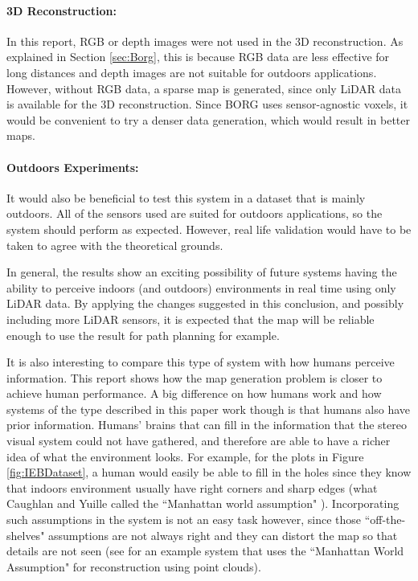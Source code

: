 \documentclass[11pt]{article}
\begin{document}
\paragraph{3D Reconstruction: } In this report, RGB or depth images were not used in the 3D reconstruction. As explained in Section \ref{sec:Borg}, this is because RGB data are less effective for long distances and depth images are not suitable for outdoors applications. However, without RGB data, a sparse map is generated, since only LiDAR data is available for the 3D reconstruction. Since BORG uses sensor-agnostic voxels, it would be convenient to try a denser data generation, which would result in better maps.
	
\paragraph{Outdoors Experiments: } It would also be beneficial to test this system in a dataset that is mainly outdoors. All of the sensors used are suited for outdoors applications, so the system should perform as expected. However, real life validation would have to be taken to agree with the theoretical grounds.

In general, the results show an exciting possibility of future systems having the ability to perceive indoors (and outdoors) environments in real time using only LiDAR data. By applying the changes suggested in this conclusion, and possibly including more LiDAR sensors, it is expected that the map will be reliable enough to use the result for path planning for example.

It is also interesting to compare this type of system with how humans perceive information. This report shows how the map generation problem is closer to achieve human performance. A big difference on how humans work and how systems of the type described in this paper work though is that humans also have prior information. Humans' brains that can fill in the information that the stereo visual system could not have gathered, and therefore are able to have a richer idea of what the environment looks. For example, for the plots in Figure \ref{fig:IEBDataset}, a human would easily be able to fill in the holes since they know that indoors environment usually have right corners and sharp edges (what Caughlan and Yuille called the ``Manhattan world assumption" \cite{coughlan1999manhattan}). Incorporating such assumptions in the system is not an easy task however, since those ``off-the-shelves" assumptions are not always right and they can distort the map so that details are not seen (see \cite{li2016boxfitting} for an example system that uses the ``Manhattan World Assumption" for reconstruction using point clouds).
 
\end{document}
